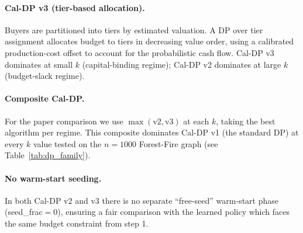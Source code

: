 \paragraph{Cal-DP v3 (tier-based allocation).}
Buyers are partitioned into tiers by estimated valuation.
A DP over tier assignment allocates budget to tiers in decreasing value order,
using a calibrated production-cost offset to account for the probabilistic cash
flow.
Cal-DP v3 dominates at small $k$ (capital-binding regime); Cal-DP v2 dominates
at large $k$ (budget-slack regime).

\paragraph{Composite Cal-DP.}
For the paper comparison we use $\max(\text{v2}, \text{v3})$ at each $k$,
taking the best algorithm per regime.
This composite dominates Cal-DP v1 (the standard DP) at every $k$ value tested
on the $n{=}1000$ Forest-Fire graph (see Table~\ref{tab:dp_family}).

\paragraph{No warm-start seeding.}
In both Cal-DP v2 and v3 there is no separate ``free-seed'' warm-start phase
(seed\_frac$=0$), ensuring a fair comparison with the learned policy which
faces the same budget constraint from step 1.
